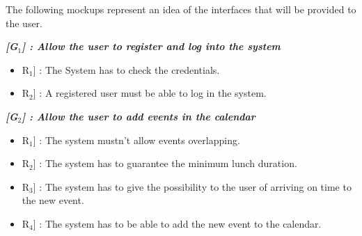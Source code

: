 \vspace*{-5mm}



The following mockups represent an idea of the interfaces that will be provided to the user.

\vspace{0.5cm}
\noindent
\emph{\textbf{[G$_{1}$] : Allow the user to register and log into the system}}
\begin{itemize}
	\setlength{\leftskip}{0.5cm}
	\item \lbrack R$_{1}$] : The System has to check the credentials.
	\item \lbrack R$_{2}$] : A registered user must be able to log in the system.
\end{itemize}

\vspace{0.5cm}
\noindent
\emph{\textbf{[G$_{2}$] : Allow the user to add events in the calendar}}
\begin{itemize}
	\setlength{\leftskip}{0.5cm}
	\item \lbrack R$_{1}$] : The system mustn’t allow events overlapping.
	\item \lbrack R$_{2}$] : The system has to guarantee the minimum lunch duration.
	\item \lbrack R$_{3}$] : The system has to give the possibility to the user of arriving on time to the new event.
	\item \lbrack R$_{4}$] : The system has to be able to add the new event to the calendar.
\end{itemize}

